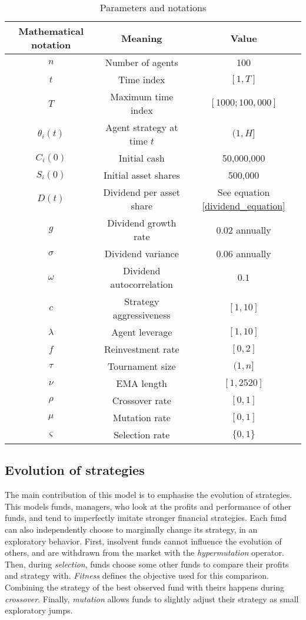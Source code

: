 \documentclass{article}
\begin{document}
\begin{table}[]
    \centering
    \begin{tabular}{c|c|c}
    Mathematical notation & Meaning & Value \\
    \hline
        $n$ & Number of agents & 100 \\
        $t$ & Time index & $[1,T]$\\
        $T$ & Maximum time index & $[1000;100,000]$\\
        $\theta_i(t)$ & Agent strategy at time $t$ & $(1, H]$\\
        $C_i(0)$ & Initial cash & 50,000,000 \\
        $S_i(0)$ & Initial asset shares & 500,000 \\
        $D(t)$ & Dividend per asset share & See equation \ref{dividend_equation} \\
        $g$ & Dividend growth rate & $0.02$ annually \\
        $\sigma$ & Dividend variance & $0.06$ annually \\
        $\omega$ & Dividend autocorrelation & $0.1$ \\
        $c$ & Strategy aggressiveness & $[1,10]$ \\
        $\lambda$ & Agent leverage & $[1,10]$ \\
        $f$ & Reinvestment rate & $[0,2]$ \\
        $\tau$ & Tournament size & $(1,n]$ \\
        $\nu$ & EMA length & $[1,2520]$ \\
        $\rho$ & Crossover rate & $[0,1]$ \\
        $\mu$ & Mutation rate & $[0,1]$ \\
        $\varsigma$ & Selection rate & $\{0,1\}$
    \end{tabular}
    \caption{Parameters and notations}
    \label{parameters_correspondence}
\end{table}

\subsection{Evolution of strategies}
The main contribution of this model is to emphasise the evolution of strategies. This models funds, managers, who look at the profits and performance of other funds, and tend to imperfectly imitate stronger financial strategies. Each fund can also independently choose to marginally change its strategy, in an exploratory behavior. First, insolvent funds cannot influence the evolution of others, and are withdrawn from the market with the \textit{hypermutation} operator. Then, during \textit{selection}, funds choose some other funds to compare their profits and strategy with. \textit{Fitness} defines the objective used for this comparison. Combining the strategy of the best observed fund with theirs happens during \textit{crossover}. Finally, \textit{mutation} allows funds to slightly adjust their strategy as small exploratory jumps.\\
\end{document}
